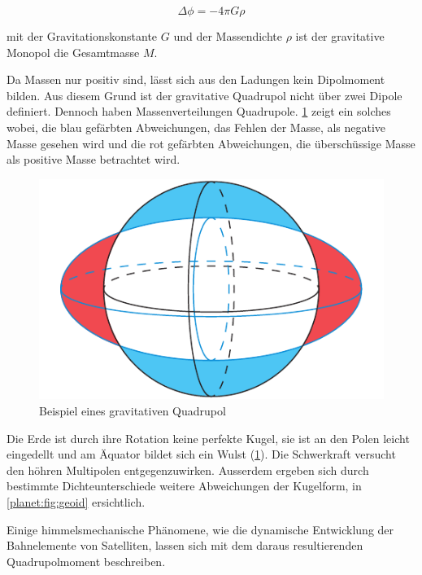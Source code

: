 \begin{equation*}
    \Delta \phi = -4\pi G\rho
\end{equation*}

\noindent
mit der Gravitationskonstante \(G\) und der Massendichte \(\rho\) ist der gravitative Monopol die Gesamtmasse \(M\).

Da Massen nur positiv sind, lässt sich aus den Ladungen kein Dipolmoment bilden.
Aus diesem Grund ist der gravitative Quadrupol nicht über zwei Dipole definiert.
Dennoch haben Massenverteilungen Quadrupole.
\cref{planet:fig:quadroearth} zeigt ein solches wobei, die blau gefärbten Abweichungen, das Fehlen der Masse, als negative Masse gesehen wird und die rot gefärbten Abweichungen, die überschüssige Masse als positive Masse betrachtet wird.  

\begin{figure}[h]
    \centering
    \includegraphics[width=0.60\linewidth]{papers/planet/pictures/Quadroearth.pdf}
    \caption{Beispiel eines gravitativen Quadrupol
        \label{planet:fig:quadroearth}}
\end{figure}

\begin{beispiel}
    Die Erde ist durch ihre Rotation keine perfekte Kugel, sie ist an den Polen leicht eingedellt und am Äquator bildet sich ein Wulst (\cref{planet:fig:quadroearth}).
    Die Schwerkraft versucht den höhren Multipolen entgegenzuwirken.
    Ausserdem ergeben sich durch bestimmte Dichteunterschiede weitere Abweichungen der Kugelform, in \cref{planet:fig:geoid} ersichtlich.
\end{beispiel}

Einige himmelsmechanische Phänomene, wie die dynamische Entwicklung der Bahnelemente von Satelliten, lassen sich mit dem daraus resultierenden Quadrupolmoment beschreiben.
